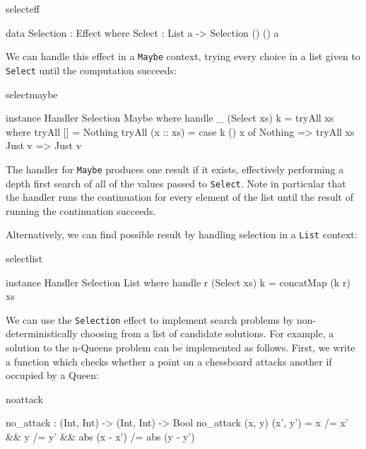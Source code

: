 \begin{SaveVerbatim}{selecteff}

data Selection : Effect where
     Select : List a -> Selection () () a

\end{SaveVerbatim}

\noindent
We can handle this effect in a \texttt{Maybe} context, trying every choice
in a list given to \texttt{Select} until the computation succeeds:

\begin{SaveVerbatim}{selectmaybe}

instance Handler Selection Maybe where
     handle _ (Select xs) k = tryAll xs where
         tryAll [] = Nothing
         tryAll (x :: xs) = case k () x of
                                 Nothing => tryAll xs
                                 Just v => Just v

\end{SaveVerbatim}

\noindent
The handler for \texttt{Maybe} produces one result if it exists, effectively
performing a depth first search of all of the values passed to \texttt{Select}.
Note in particular that the handler runs the continuation for every element
of the list until the result of running the continuation succeeds.

Alternatively, we can find  possible result by handling selection
in a \texttt{List} context:

\begin{SaveVerbatim}{selectlist}

instance Handler Selection List where
     handle r (Select xs) k = concatMap (k r) xs

\end{SaveVerbatim}

\noindent
We can use the \texttt{Selection} effect to implement search problems by
non-deterministically choosing from a list of candidate solutions. For example,
a solution to the n-Queens problem can be implemented as follows.
First, we write a function which checks whether a point on a chessboard
attacks another if occupied by a Queen:

\begin{SaveVerbatim}{noattack}

no_attack : (Int, Int) -> (Int, Int) -> Bool
no_attack (x, y) (x', y')
   = x /= x' && y /= y' && abs (x - x') /= abs (y - y')

\end{SaveVerbatim}

